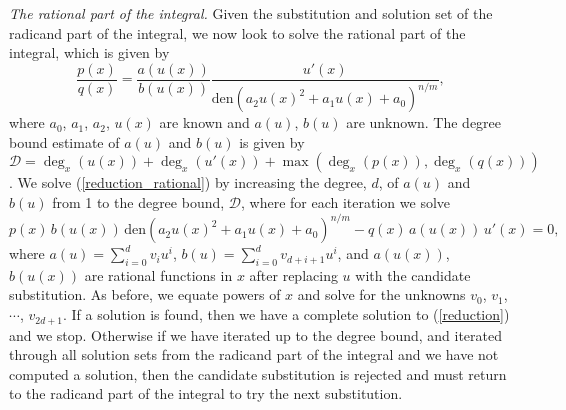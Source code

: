 \documentclass[12pt]{article}
\numberwithin{equation}{section}
\theoremstyle{definition}
\begin{document}
\textit{The rational part of the integral.} Given the substitution and solution set of 
the radicand part of the integral, we now look to solve the rational part of the integral, 
which is given by 
\begin{equation}
\frac{p(x)}{q(x)} = \frac{a(u(x))}{b(u(x))}\frac{u'(x)}{\text{den}\left(a_2u(x)^2+a_1u(x)+a_0\right)^{n/m}}, \label{reduction_rational}
\end{equation}
where $a_0$, $a_1$, $a_2$, $u(x)$ are known and $a(u)$, $b(u)$ are unknown. The degree bound estimate  
of $a(u)$ and $b(u)$ is given by $\mathcal{D} = \deg_x(u(x)) + \deg_x(u'(x)) + \max\left( \deg_x(p(x)), \deg_x(q(x)) \right)$. We solve 
(\ref{reduction_rational}) by increasing the degree, $d$, of $a(u)$ and $b(u)$ from 1 to the degree 
bound, $\mathcal{D}$, where for each iteration we solve
\begin{equation*}
p(x)\,b(u(x))\,\text{den}\left(a_2u(x)^2 + a_1u(x) + a_0\right)^{n/m} - q(x)\,a(u(x))\,u'(x) = 0,
\end{equation*}
where $a(u) = \sum\limits_{i=0}^d v_i u^i$, $b(u) = \sum\limits_{i=0}^d v_{d+i+1} u^i$, and 
$a(u(x))$, $b(u(x))$ are rational functions in $x$ after replacing $u$ with the candidate 
substitution. As before, we equate powers of $x$ and solve for the unknowns $v_0$, $v_1$, 
$\cdots$, $v_{2d+1}$. If a solution is found, then we have a complete solution to 
(\ref{reduction}) and we stop. Otherwise if we have iterated up to the degree bound, and 
iterated through all solution sets from the radicand part of the integral and we have not 
computed a solution, then the candidate substitution is rejected and must return to the 
radicand part of the integral to try the next substitution.
\iffalse
\end{document}
